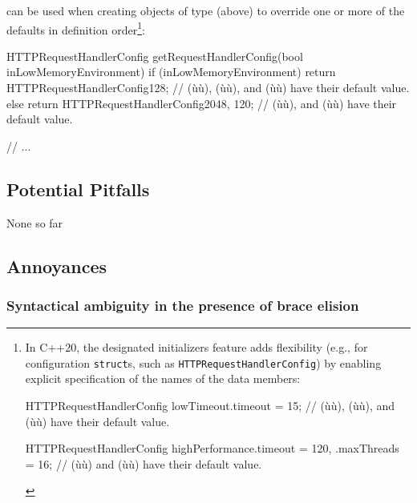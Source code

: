 \noindent {} can be used when creating objects of
type  (above) to override one or more
of the defaults in definition order{\cprotect\footnote{In C++20, the
designated initializers feature adds flexibility (e.g., for
configuration \lstinline!struct!s, such as
\lstinline!HTTPRequestHandlerConfig!) by enabling explicit specification
of the names of the data members:

\begin{emcppslisting}[emcppsbatch=e4, basicstyle={\ttfamily\footnotesize}]
HTTPRequestHandlerConfig lowTimeout{.timeout = 15};
    // (ù{}ù), (ù{}ù), and (ù{}ù) have their default value.

HTTPRequestHandlerConfig highPerformance{.timeout = 120, .maxThreads = 16};
    // (ù{}ù) and (ù{}ù) have their default value.
\end{emcppslisting}
      }}:

\begin{emcppslisting}[emcppsbatch=e4]
HTTPRequestHandlerConfig getRequestHandlerConfig(bool inLowMemoryEnvironment)
{
    if (inLowMemoryEnvironment)
    {
        return HTTPRequestHandlerConfig{128};
            // (ù{}ù), (ù{}ù), and (ù{}ù) have their default value.
    }
    else
    {
        return HTTPRequestHandlerConfig{2048, 120};
            // (ù{}ù), and (ù{}ù) have their default value.
    }
}

// ...
\end{emcppslisting}


\subsection[Potential Pitfalls]{Potential Pitfalls}\label{potential-pitfalls}

None so far

\subsection[Annoyances]{Annoyances}\label{annoyances}

\subsubsection[Syntactical ambiguity in the presence of brace elision]{Syntactical ambiguity in the presence of brace elision}\label{syntactical-ambiguity-in-the-presence-of-brace-elision}

